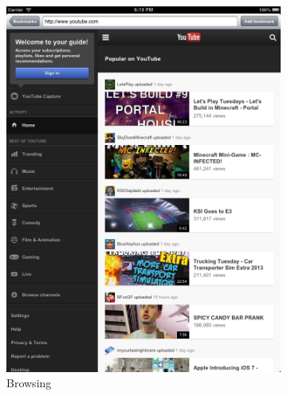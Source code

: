\documentclass[a4wide, 10pt]{article}
\begin{document}
\begin{figure}
        \centering
        \begin{subfigure}[b]{0.4\textwidth}
                \centering
                \includegraphics[width=\textwidth]{"screenshots/In-App Browsing"}
                \caption{Browsing}
        \end{subfigure}%
        ~ %
        \begin{subfigure}[b]{0.4\textwidth}
                \centering

\end{subfigure}
\end{figure}
\end{document}
